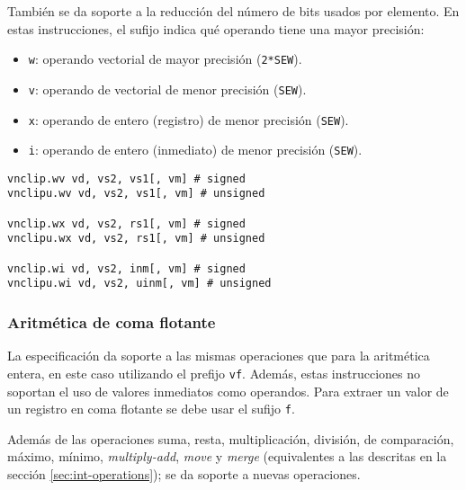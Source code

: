 También se da soporte a la reducción del número de bits usados por elemento.
En estas instrucciones, el sufijo indica qué operando tiene una mayor precisión:
\begin{itemize}
\item \texttt{w}: operando vectorial de mayor precisión (\texttt{2*SEW}).
\item \texttt{v}: operando de vectorial de menor precisión (\texttt{SEW}).
\item \texttt{x}: operando de entero (registro) de menor precisión (\texttt{SEW}).
\item \texttt{i}: operando de entero (inmediato) de menor precisión (\texttt{SEW}).
\end{itemize}

\begin{lstlisting}
vnclip.wv vd, vs2, vs1[, vm] # signed
vnclipu.wv vd, vs2, vs1[, vm] # unsigned

vnclip.wx vd, vs2, rs1[, vm] # signed
vnclipu.wx vd, vs2, rs1[, vm] # unsigned

vnclip.wi vd, vs2, inm[, vm] # signed
vnclipu.wi vd, vs2, uinm[, vm] # unsigned
\end{lstlisting}

\subsubsection{Aritmética de coma flotante}
La especificación da soporte a las mismas operaciones que para la aritmética
entera, en este caso utilizando el prefijo \texttt{vf}. Además, estas
instrucciones no soportan el uso de valores inmediatos como operandos. Para
extraer un valor de un registro en coma flotante se debe usar el sufijo
\texttt{f}.

Además de las operaciones suma, resta, multiplicación, división, de
comparación, máximo, mínimo, \textit{multiply-add}, \textit{move} y
\textit{merge} (equivalentes a las descritas en la sección
\ref{sec:int-operations}); se da soporte a nuevas operaciones.

